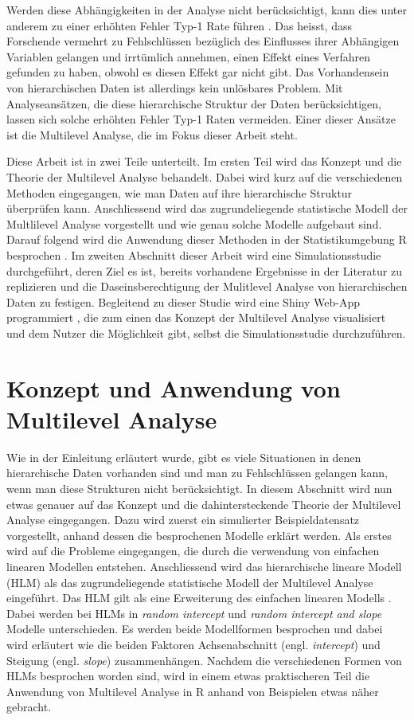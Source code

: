 \documentclass[12pt]{article}\usepackage[]{graphicx}\usepackage[]{color}
\begin{document}
Werden diese Abhängigkeiten in der Analyse nicht berücksichtigt, kann dies unter anderem zu einer erhöhten Fehler Typ-1 Rate führen \citep{dorman2008effect, mcneish2014analyzing}. Das heisst, dass Forschende vermehrt zu Fehlschlüssen bezüglich des Einflusses ihrer Abhängigen Variablen gelangen und irrtümlich annehmen, einen Effekt eines Verfahren gefunden zu haben, obwohl es diesen Effekt gar nicht gibt. Das Vorhandensein von hierarchischen Daten ist allerdings kein unlösbares Problem. Mit Analyseansätzen, die diese hierarchische Struktur der Daten berücksichtigen, lassen sich solche erhöhten Fehler Typ-1 Raten vermeiden. Einer dieser Ansätze ist die Multilevel Analyse, die im Fokus dieser Arbeit steht.

Diese Arbeit ist in zwei Teile unterteilt. Im ersten Teil wird das Konzept und die Theorie der Multilevel Analyse behandelt. Dabei wird kurz auf die verschiedenen Methoden eingegangen, wie man Daten auf ihre hierarchische Struktur überprüfen kann. Anschliessend wird das zugrundeliegende statistische Modell der Multlilevel Analyse vorgestellt und wie genau solche Modelle aufgebaut sind. Darauf folgend wird die Anwendung dieser Methoden in der Statistikumgebung R besprochen \citep{R}. Im zweiten Abschnitt dieser Arbeit wird eine Simulationsstudie durchgeführt, deren Ziel es ist, bereits vorhandene Ergebnisse in der Literatur zu replizieren und die Daseinsberechtigung der Mulitlevel Analyse von hierarchischen Daten zu festigen. Begleitend zu dieser Studie wird eine Shiny Web-App programmiert \citep{shiny}, die zum einen das Konzept der Multilevel Analyse visualisiert und dem Nutzer die Möglichkeit gibt, selbst die Simulationsstudie durchzuführen. 

\section{Konzept und Anwendung von Multilevel Analyse}
Wie in der Einleitung erläutert wurde, gibt es viele Situationen in denen hierarchische Daten vorhanden sind und man zu Fehlschlüssen gelangen kann, wenn man diese Strukturen nicht berücksichtigt. In diesem Abschnitt wird nun etwas genauer auf das Konzept und die dahintersteckende Theorie der Multilevel Analyse eingegangen. Dazu wird zuerst ein simulierter Beispieldatensatz vorgestellt, anhand dessen die besprochenen Modelle erklärt werden. Als erstes wird auf die Probleme eingegangen, die durch die verwendung von einfachen linearen Modellen entstehen. Anschliessend wird das hierarchische lineare Modell (HLM) als das zugrundeliegende statistische Modell der Multilevel Analyse eingeführt. Das HLM gilt als eine Erweiterung des einfachen linearen Modells \cite{SnijdersTomA.B2012Ma:a}. Dabei werden bei HLMs in \textit{random intercept} und \textit{random intercept and slope} Modelle unterschieden. Es werden beide Modellformen besprochen und dabei wird erläutert wie die beiden Faktoren Achsenabschnitt (engl. \textit{intercept}) und Steigung (engl. \textit{slope}) zusammenhängen. Nachdem die verschiedenen Formen von HLMs besprochen worden sind, wird in einem etwas praktischeren Teil die Anwendung von Multilevel Analyse in R anhand von Beispielen etwas näher gebracht.
\end{document}

